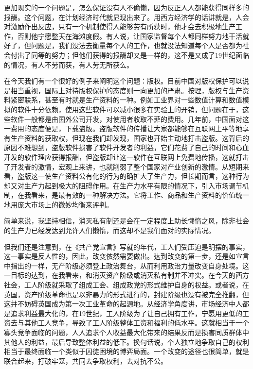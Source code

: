 \documentclass[a4paper,11pt]{ctexart}
\begin{document}
更加现实的一个问题是，怎么保证没有人不偷懒，因为反正人人都能获得同样多的报酬。这个问题，在计划经济时代就显现出来了。用西方经济学的话讲就是，人会对激励作出反应，只有一个机制使得人能够劳有所获时，他才会去积极地生产工作，否则他宁愿整天在海滩度假。有人说，让国家监督每个人都同样努力地干活就好了，但问题是，我们没法去衡量每个人的工作，也就没法知道每个人是否都为社会付出了同等的努力；但他们获得的报酬却又是一样的，这不是又成了19世纪面临的情况，有人不劳而获，有人劳无所获么。\par
在今天我们有一个很好的例子来阐明这个问题：版权。目前中国对版权保护可以说是相当重视，国际上对待版权保护的态度则一向更加的严肃。按理，版权与生产资料紧密联系，甚至有时就是生产资料的一种。例如工业界对一些数值计算和数值模拟的软件十分依赖，使用这些软件可以减小很多在实验上的开销，但问题在于，这些软件一般都是由国外公司开发，对使用者收取不菲的费用。几年前，中国面对这一费用的态度便是，下载盗版。盗版软件的传播让大家都能够在互联网上平等地享有生产资料的获取权，但现在我们却发现，国家也开始主动地打击盗版。这背后的原因不难想到，盗版软件损害了软件开发者的利益，它们花费了自己的时间和心血开发的软件理应获得报酬，但盗版却让这一软件在互联网上免费地传播，这就打击了开发者的激情，宏观上来讲，也就削弱了整个国家对产业创新的激情。从短期来看，盗版这一使生产资料公有化的行为的确扩大了生产力，但长期而言，这种行为却又对生产力起到极大的阻碍作用。在生产力水平有限的情况下，引入市场调节机制，在我看来，是最有效的一种解决方法。它将工作、商品和生产资料的价值统一地用庞大市场上的微妙均衡来评判。\par
简单来说，我坚持相信，消灭私有制还是会在一定程度上助长懒惰之风，除非社会的生产力已经发达到允许人们懒惰，而这却不是我们面对的实际情况。\par
但我们还是注意到，在《共产党宣言》写就的年代，工人们受压迫是明摆的事实，这一事实是反人性的，因此，改变依然需要做出。达到改变的第一步，还是如宣言中指出的一样，无产阶级必须登上政治舞台，从而利用政治力量改变自身处境。这一目标的达到，在我看来，和消灭资产阶级或消灭私有制并不冲突。在今天的西方社会，工人阶级就采取了组成工会、组成政党的形式维护自身的权益。或者说，在英国，资产阶级革命也是以非暴力的形式进行的，封建阶级也没有被完全推翻，但这并不妨碍英国成为第一次工业革命的起源地。从经济学角度讲，市场经济中人都是追求利益最大化的，在19世纪，工人阶级为了让自己拥有工作，宁愿用更低的工资去与其他工人竞争，导致了工人阶级整体工资和福利的低水平。这就相当于一个寡头竞争面临的问题，人人追求个人收益最大化带来的结果反而是损害同质群体中其他人的利益，最后导致整体利益的低下。换句话说，个人独立地争取自己的权利相当于最终面临一个类似于囚徒困境的博弈局面。一个改变的途径也很简单，就是联合起来，打破牢笼，共同去争取权利，去对抗不公。\par
\end{document}
